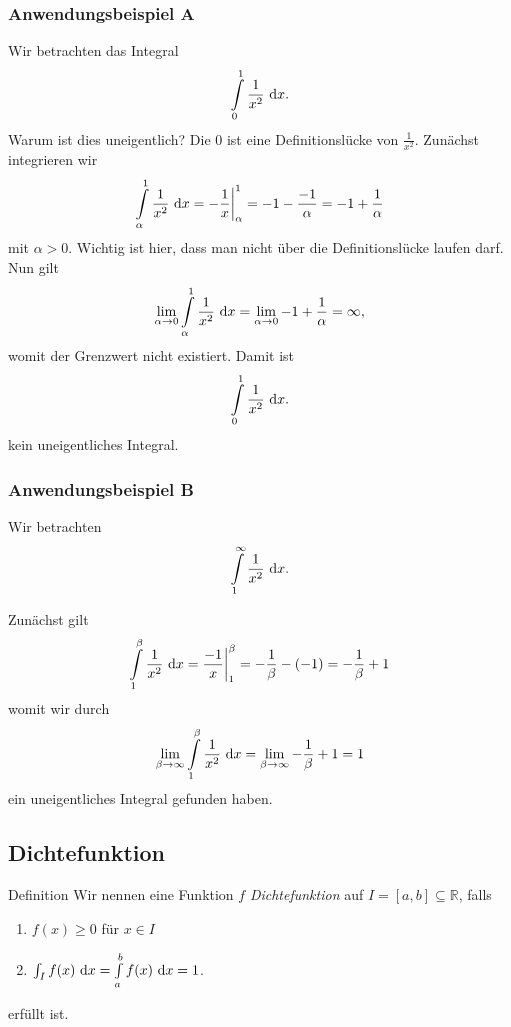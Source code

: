 \subsubsection*{Anwendungsbeispiel A}
Wir betrachten das Integral
\begin{align*}
\int \limits_0^1 \frac{1}{x^2} \ \text{\rmfamily d} x.
\end{align*}
Warum ist dies uneigentlich? Die $0$ ist eine Definitionslücke von $\frac{1}{x^2}$.
Zunächst integrieren wir 
\begin{align*}
\int \limits_\alpha^1 \frac{1}{x^2} \ \text{\rmfamily d} x = - \frac{1}{x} \bigg|_\alpha^1 =  -1 - \frac{-1}{\alpha}= -1 + \frac{1}{\alpha}
\end{align*}
mit $\alpha > 0$.
Wichtig ist hier, dass man nicht über die Definitionslücke laufen darf.
Nun gilt
\begin{align*}
\lim \limits_{\alpha \to 0}  \int \limits_\alpha^1 \frac{1}{x^2} \ \text{\rmfamily d} x  = \lim \limits_{\alpha \to 0}  -1 + \frac{1}{\alpha} = \infty,
\end{align*}
womit der Grenzwert nicht existiert.
Damit ist 
\begin{align*}
\int \limits_0^1 \frac{1}{x^2} \ \text{\rmfamily d} x.
\end{align*}
kein uneigentliches Integral.

\subsubsection*{Anwendungsbeispiel B}
Wir betrachten
\begin{align*}
\int \limits_1^\infty \frac{1}{x^2} \ \text{\rmfamily d} x.
\end{align*}

Zunächst gilt
\begin{align*}
\int \limits_1^\beta \frac{1}{x^2} \ \text{\rmfamily d} x = \frac{-1}{x} \bigg|_1^\beta = - \frac{1}{\beta} - (-1)
=
-\frac{1}{\beta } + 1
\end{align*}
womit wir durch
\begin{align*}
\lim \limits_{\beta \to \infty}  \int \limits_1^\beta \frac{1}{x^2} \ \text{\rmfamily d} x 
= 
\lim \limits_{\beta \to \infty} - \frac{1}{\beta} + 1 = 1
\end{align*}
ein uneigentliches Integral gefunden haben.

\newpage
\subsection{Dichtefunktion}
\begin{mybox}{Definition}
Wir nennen eine Funktion $f$ \textit{Dichtefunktion} auf $I = [a,b] \subseteq \mathbb{R}$, falls
\renewcommand{\labelenumi}{(\roman{enumi})}
\begin{enumerate}
\item $f(x) \geq 0 $ für $x \in I$ 
\item $\int_I f(x) \ \text{\rmfamily d} x =\int \limits_a^b f(x) \ \text{\rmfamily d} x= 1$.
\end{enumerate}
erfüllt ist.
\end{mybox}

